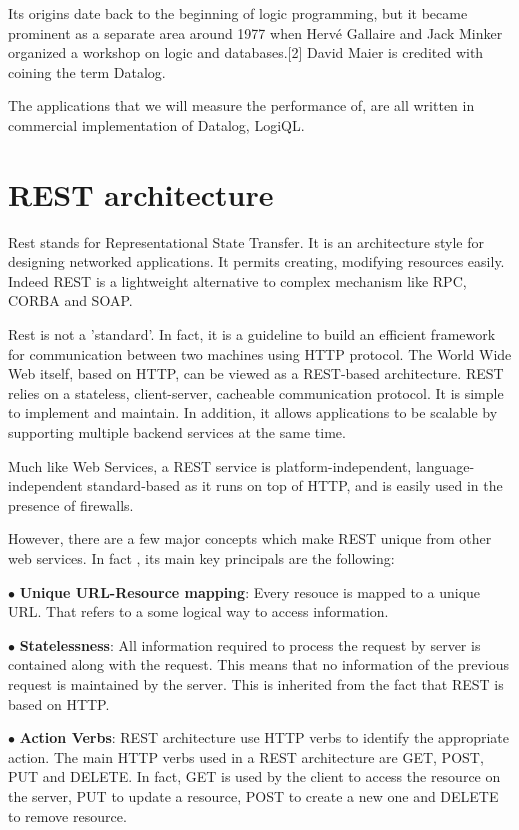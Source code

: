 Its origins date back to the beginning of logic programming, but it became
prominent as a separate area around 1977 when Hervé Gallaire and Jack Minker
organized a workshop on logic and databases.[2] David Maier is credited with
coining the term Datalog.

The applications that we will measure the performance of, are all written in
commercial implementation of Datalog, LogiQL.

\section{REST architecture}
Rest stands for Representational State Transfer. It is an architecture style for
designing networked applications. It permits creating, modifying resources
easily. Indeed REST is a lightweight alternative to complex mechanism like RPC,
CORBA and SOAP.

Rest is not a 'standard'. In fact,  it is a guideline to build an efficient
framework for communication between two machines using HTTP protocol. The World
Wide Web itself, based on HTTP, can be viewed as a REST-based architecture. REST
relies on a stateless, client-server, cacheable communication protocol. It is
simple to implement and maintain. In addition, it allows applications to be scalable
by supporting multiple backend services at the same time.

Much like Web Services, a REST service is platform-independent,
language-independent standard-based as it runs on top of HTTP, and is easily used
in the presence of firewalls.

However, there are a few major concepts which make REST unique from other web
services. In fact , its main key principals are the following:

$\bullet$ \textbf{Unique URL-Resource mapping}: Every resouce is mapped to a unique URL. That
refers to a some logical way  to access information. 

$\bullet$ \textbf{Statelessness}: All information required to process the request by server is
contained along with the request. This means that no information of the previous
request is maintained by the server. This is inherited from the fact that REST
is based on HTTP.

$\bullet$ \textbf{Action Verbs}: REST architecture use HTTP verbs to identify the appropriate
action. The main HTTP verbs used in a REST architecture are GET, POST, PUT and
DELETE. In fact, GET is used by the client to access the resource on the server,
PUT to update a resource, POST to create a new one and DELETE to remove
resource.

